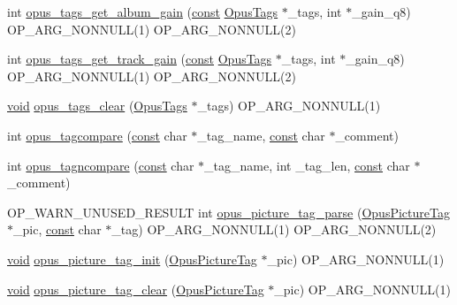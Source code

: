 \begin{DoxyCompactItemize}
\item 
int \hyperlink{group__header__info_gab830a22ec7341069f3928d505ad04a56}{opus\+\_\+tags\+\_\+get\+\_\+album\+\_\+gain} (\hyperlink{zconf_8h_a2c212835823e3c54a8ab6d95c652660e}{const} \hyperlink{struct_opus_tags}{Opus\+Tags} $\ast$\+\_\+tags, int $\ast$\+\_\+gain\+\_\+q8) O\+P\+\_\+\+A\+R\+G\+\_\+\+N\+O\+N\+N\+U\+LL(1) O\+P\+\_\+\+A\+R\+G\+\_\+\+N\+O\+N\+N\+U\+LL(2)
\item 
int \hyperlink{group__header__info_ga093ce83b90c68951f2e6aedc66344ce5}{opus\+\_\+tags\+\_\+get\+\_\+track\+\_\+gain} (\hyperlink{zconf_8h_a2c212835823e3c54a8ab6d95c652660e}{const} \hyperlink{struct_opus_tags}{Opus\+Tags} $\ast$\+\_\+tags, int $\ast$\+\_\+gain\+\_\+q8) O\+P\+\_\+\+A\+R\+G\+\_\+\+N\+O\+N\+N\+U\+LL(1) O\+P\+\_\+\+A\+R\+G\+\_\+\+N\+O\+N\+N\+U\+LL(2)
\item 
\hyperlink{png_8h_ac9c84fa68bbad002983e35ce3663c686}{void} \hyperlink{group__header__info_ga16d4f85561a965d56e0c5177fa129c35}{opus\+\_\+tags\+\_\+clear} (\hyperlink{struct_opus_tags}{Opus\+Tags} $\ast$\+\_\+tags) O\+P\+\_\+\+A\+R\+G\+\_\+\+N\+O\+N\+N\+U\+LL(1)
\item 
int \hyperlink{group__header__info_gaad7582aee9be320d26b13f77e7b54106}{opus\+\_\+tagcompare} (\hyperlink{zconf_8h_a2c212835823e3c54a8ab6d95c652660e}{const} char $\ast$\+\_\+tag\+\_\+name, \hyperlink{zconf_8h_a2c212835823e3c54a8ab6d95c652660e}{const} char $\ast$\+\_\+comment)
\item 
int \hyperlink{group__header__info_gabf02fa65e49fde045ef787e42ef7b8c0}{opus\+\_\+tagncompare} (\hyperlink{zconf_8h_a2c212835823e3c54a8ab6d95c652660e}{const} char $\ast$\+\_\+tag\+\_\+name, int \+\_\+tag\+\_\+len, \hyperlink{zconf_8h_a2c212835823e3c54a8ab6d95c652660e}{const} char $\ast$\+\_\+comment)
\item 
O\+P\+\_\+\+W\+A\+R\+N\+\_\+\+U\+N\+U\+S\+E\+D\+\_\+\+R\+E\+S\+U\+LT int \hyperlink{group__header__info_ga6487af1d21fe87f4815567d85a27989a}{opus\+\_\+picture\+\_\+tag\+\_\+parse} (\hyperlink{struct_opus_picture_tag}{Opus\+Picture\+Tag} $\ast$\+\_\+pic, \hyperlink{zconf_8h_a2c212835823e3c54a8ab6d95c652660e}{const} char $\ast$\+\_\+tag) O\+P\+\_\+\+A\+R\+G\+\_\+\+N\+O\+N\+N\+U\+LL(1) O\+P\+\_\+\+A\+R\+G\+\_\+\+N\+O\+N\+N\+U\+LL(2)
\item 
\hyperlink{png_8h_ac9c84fa68bbad002983e35ce3663c686}{void} \hyperlink{group__header__info_ga09b9724bb7a9abd1d78680bd7d420ec2}{opus\+\_\+picture\+\_\+tag\+\_\+init} (\hyperlink{struct_opus_picture_tag}{Opus\+Picture\+Tag} $\ast$\+\_\+pic) O\+P\+\_\+\+A\+R\+G\+\_\+\+N\+O\+N\+N\+U\+LL(1)
\item 
\hyperlink{png_8h_ac9c84fa68bbad002983e35ce3663c686}{void} \hyperlink{group__header__info_ga26a732722fc74274d76b855020822852}{opus\+\_\+picture\+\_\+tag\+\_\+clear} (\hyperlink{struct_opus_picture_tag}{Opus\+Picture\+Tag} $\ast$\+\_\+pic) O\+P\+\_\+\+A\+R\+G\+\_\+\+N\+O\+N\+N\+U\+LL(1)
\end{DoxyCompactItemize}



